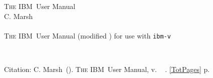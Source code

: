 \documentclass[a4paper,11pt,twoside,pdftex]{article}
\newcommand{\DocYear}{\SourceControlYearDoc}
\newcommand{\DocVer}{\SourceControlDateDoc}
\newcommand{\VER}{v\SourceControlShortVersionDoc} %
\newcommand{\IBM}{\textsc{The IBM}}
\newcommand{\ibm}{\texttt{ibm}} %
\newcommand{\authors}{C. Marsh}
\newcommand{\authorsTitleFirstLine}{C. Marsh}
\newcommand{\Organisation}{ } %
\newcommand{\ManualRef}{\authors\ (\DocYear). \IBM\ User Manual, \VER. \Organisation\ \emph{ }. \ref{TotPages} p.} %
\let\origdoublepage\cleardoublepage
\newcommand{\clearemptydoublepage}{%
  \clearpage
  {\pagestyle{empty}\origdoublepage}%
}
\begin{document}
 
\sloppy %



\begin{titlepage}
  \thispagestyle{empty} %
	\begin{center}

		\vspace{1cm}

		\vspace*{2.5cm}
		\Huge \IBM\ User Manual \\

		\vspace{2.0cm}
		\huge \authorsTitleFirstLine \\ %


		~\vfill
		\Large \DocYear \\%

		\vspace{1.0cm}
		\IBM\ User Manual (modified \DocVer) for use with \ibm\texttt{-\VER}
	
	\end{center}
\end{titlepage}


\cleardoublepage{}
\fancyfoot[C]{\thepage}

~\vfill

\begin{center}
Citation: \ManualRef    
\end{center}

\clearemptydoublepage{}

\begin{spacing}{0.8} %
\tableofcontents
\end{spacing}

\end{document}
